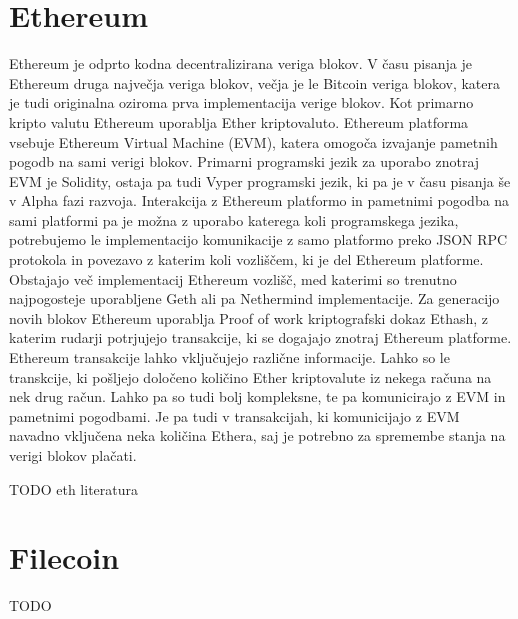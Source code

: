 \documentclass[a4paper,12pt,openright]{book}
\begin{document}
\section{Ethereum}
Ethereum je odprto kodna decentralizirana veriga blokov.
V času pisanja je Ethereum druga največja veriga blokov, večja je le Bitcoin veriga blokov, katera je tudi originalna oziroma prva implementacija verige blokov.
Kot primarno kripto valutu Ethereum uporablja Ether kriptovaluto.
Ethereum platforma vsebuje Ethereum Virtual Machine (EVM), katera omogoča izvajanje pametnih pogodb na sami verigi blokov.
Primarni programski jezik za uporabo znotraj EVM je Solidity, ostaja pa tudi Vyper programski jezik, ki pa je v času pisanja še v Alpha fazi razvoja.
Interakcija z Ethereum platformo in pametnimi pogodba na sami platformi pa je možna z uporabo katerega koli programskega jezika, potrebujemo le implementacijo komunikacije z samo platformo preko JSON RPC protokola in povezavo z katerim koli vozliščem, ki je del Ethereum platforme.
Obstajajo več implementacij Ethereum vozlišč, med katerimi so trenutno najpogosteje uporabljene Geth ali pa Nethermind implementacije.
Za generacijo novih blokov Ethereum uporablja Proof of work kriptografski dokaz Ethash, z katerim rudarji potrjujejo transakcije, ki se dogajajo znotraj Ethereum platforme. 
Ethereum transakcije lahko vključujejo različne informacije. 
Lahko so le transkcije, ki pošljejo določeno količino Ether kriptovalute iz nekega računa na nek drug račun.
Lahko pa so tudi bolj kompleksne, te pa komunicirajo z EVM in pametnimi pogodbami.
Je pa tudi v transakcijah, ki komunicijajo z EVM navadno vključena neka količina Ethera, saj je potrebno za spremembe stanja na verigi blokov plačati.

TODO eth literatura

\section{Filecoin}
TODO
\end{document}

